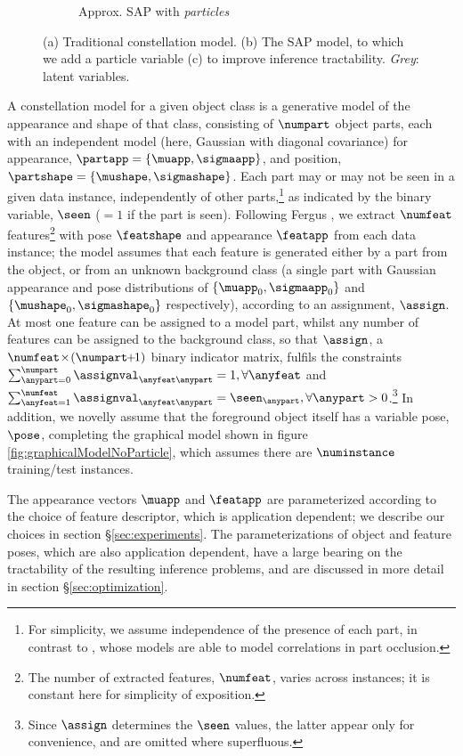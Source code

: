 \begin{figure}[ht]
\begin{subfigure}[t]{0.48\linewidth}
	\caption{Approx. SAP with \emph{particles}}
	\label{fig:graphicalModelParticle}
\end{subfigure}
\caption{(a) Traditional constellation model. (b) The SAP model, to which we add a particle variable (c) to improve inference tractability. \emph{Grey}: latent variables.}
\label{fig:graphicalmodel}
\end{figure} 

A constellation model for a given object class is a generative model of the appearance and shape of that class, consisting of $\numpart$ object parts, each with an independent model (here, Gaussian with diagonal covariance) for appearance, $\partapp=\{\muapp,\sigmaapp\}$, and position, $\partshape=\{\mushape,\sigmashape\}$. Each part may or may not be seen in a given data instance, independently of other parts,\!\!\footnote{For simplicity, we assume independence of the presence of each part, in contrast to \cite{Fergus2007,Weber2000}, whose models are able to model correlations in part occlusion.} as indicated by the binary variable, $\seen$ ($=1$ if the part is seen). Following Fergus \etal \cite{Fergus2007}, we extract $\numfeat$ features\footnote{The number of extracted features, $\numfeat$, varies across instances; it is constant here for simplicity of exposition.} with pose $\featshape$ and appearance $\featapp$ from each data instance; the model assumes that each feature is generated either by a part from the object, or from an unknown background class (a single part with Gaussian appearance and pose distributions of $\{\muapp_0,\sigmaapp_0\}$ and $\{\mushape_0,\sigmashape_0\}$ respectively), according to an assignment, $\assign$. At most one feature can be assigned to a model part, whilst any number of features can be assigned to the background class, so that $\assign$, a $\numfeat\!\times\!(\numpart\!\!+\!\!1)$ binary indicator matrix, fulfils the constraints $\sum_{\anypart = 0}^{\numpart}\assignval_{\anyfeat\anypart}=1,\forall \anyfeat$ and $\sum_{\anyfeat = 1}^{\numfeat}\assignval_{\anyfeat\anypart}=\seen_\anypart,\forall \anypart>0$.\!\!\footnote{Since $\assign$ determines the $\seen$ values, the latter appear only for convenience, and are omitted where superfluous.} In addition, we novelly assume that the foreground object itself has a variable pose, $\pose$, completing the graphical model shown in figure \ref{fig:graphicalModelNoParticle}, which assumes there are $\numinstance$ training/test instances.

The appearance vectors $\muapp$ and $\featapp$ are parameterized according to the choice of feature descriptor, which is application dependent; we describe our choices in section \S\ref{sec:experiments}. The parameterizations of object and feature poses, which are also application dependent, have a large bearing on the tractability of the resulting inference problems, and are discussed in more detail in section \S\ref{sec:optimization}.

